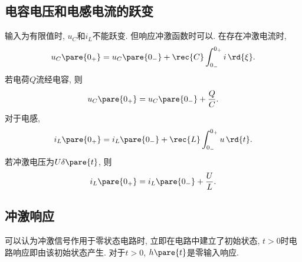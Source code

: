 \documentclass{ctexart}
\begin{document}

\subsection{电容电压和电感电流的跃变} %
\label{sub:电容电压和电感电流的跃变}

输入为有限值时, $u_C$和$i_L$不能跃变. 但响应冲激函数时可以. 在存在冲激电流时,
\[ u_C\pare{0_+} = u_C\pare{0_-}+\rec{C}\int_{0_-}^{0_+} i\,\rd{\xi}. \]
若电荷$Q$流经电容, 则
\[ u_C\pare{0_+} = u_C\pare{0_-} + \frac{Q}{C}. \]
对于电感,
\[ i_L\pare{0_+} = i_L\pare{0_-} + \rec{L} \int_{0_-}^{0_+} u\,\rd{t}. \]
若冲激电压为$U\delta\pare{t}$, 则
\[ i_L\pare{0_+} = i_L\pare{0_-} + \frac{U}{L}. \]


\subsection{冲激响应} %
\label{sub:冲激响应}

可以认为冲激信号作用于零状态电路时, 立即在电路中建立了初始状态, $t>0$时电路响应即由该初始状态产生. 对于$t>0$, $h\pare{t}$是零输入响应.


\end{document}
